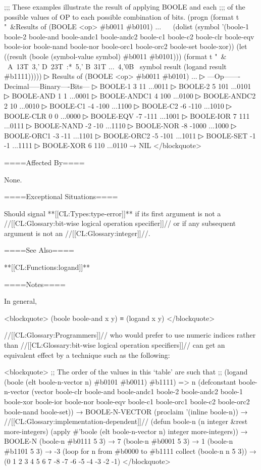 ;;; These examples illustrate the result of applying BOOLE and each ;;; of the possible values of OP to each possible combination of bits. (progn (format t "~&Results of (BOOLE <op> #b0011 #b0101) ...~ ~ (dolist (symbol '(boole-1 boole-2 boole-and boole-andc1 boole-andc2 boole-c1 boole-c2 boole-clr boole-eqv boole-ior boole-nand boole-nor boole-orc1 boole-orc2 boole-set boole-xor)) (let ((result (boole (symbol-value symbol) #b0011 #b0101))) (format t "~& ~A~13T~3,' D~23T~:*~5,' B~31T ...~4,'0B~ symbol result (logand result #b1111)))))
▷ Results of (BOOLE <op> #b0011 #b0101) ...
▷ ---Op-------Decimal-----Binary----Bits---
▷ BOOLE-1 3 11 ...0011
▷ BOOLE-2 5 101 ...0101
▷ BOOLE-AND 1 1 ...0001
▷ BOOLE-ANDC1 4 100 ...0100
▷ BOOLE-ANDC2 2 10 ...0010
▷ BOOLE-C1 -4 -100 ...1100
▷ BOOLE-C2 -6 -110 ...1010
▷ BOOLE-CLR 0 0 ...0000
▷ BOOLE-EQV -7 -111 ...1001
▷ BOOLE-IOR 7 111 ...0111
▷ BOOLE-NAND -2 -10 ...1110
▷ BOOLE-NOR -8 -1000 ...1000
▷ BOOLE-ORC1 -3 -11 ...1101
▷ BOOLE-ORC2 -5 -101 ...1011
▷ BOOLE-SET -1 -1 ...1111
▷ BOOLE-XOR 6 110 ...0110 → NIL </blockquote>

====Affected By====

None.

====Exceptional Situations====

Should signal **[[CL:Types:type-error]]** if its first argument is not a //[[CL:Glossary:bit-wise logical operation specifier]]// or if any subsequent argument is not an //[[CL:Glossary:integer]]//.

====See Also====

**[[CL:Functions:logand]]**

====Notes====

In general,

<blockquote> (boole boole-and x y) ≡ (logand x y) </blockquote>

//[[CL:Glossary:Programmers]]// who would prefer to use numeric indices rather than //[[CL:Glossary:bit-wise logical operation specifiers]]// can get an equivalent effect by a technique such as the following:

<blockquote> ;; The order of the values in this `table' are such that ;; (logand (boole (elt boole-n-vector n) #b0101 #b0011) #b1111) => n (defconstant boole-n-vector (vector boole-clr boole-and boole-andc1 boole-2 boole-andc2 boole-1 boole-xor boole-ior boole-nor boole-eqv boole-c1 boole-orc1 boole-c2 boole-orc2 boole-nand boole-set)) → BOOLE-N-VECTOR (proclaim '(inline boole-n)) → //[[CL:Glossary:implementation-dependent]]// (defun boole-n (n integer &rest more-integers) (apply #'boole (elt boole-n-vector n) integer more-integers)) → BOOLE-N (boole-n #b0111 5 3) → 7 (boole-n #b0001 5 3) → 1 (boole-n #b1101 5 3) → -3 (loop for n from #b0000 to #b1111 collect (boole-n n 5 3)) → (0 1 2 3 4 5 6 7 -8 -7 -6 -5 -4 -3 -2 -1) </blockquote>

